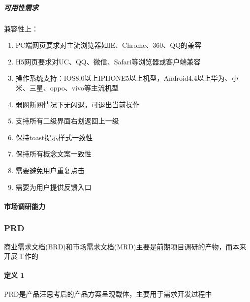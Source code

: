 \documentclass[letterpaper,11pt,english]{sphinxmanual}
\begin{document}
\subparagraph{可用性需求}
\label{\detokenize{chapter_knowledge/MRD:id8}}
兼容性上：
\begin{enumerate}
%
\item {} 
PC端网页要求对主流浏览器如IE、Chrome、360、QQ的兼容

\item {} 
H5网页要求对UC、QQ、微信、Safari等浏览器或客户端兼容%
\begin{footnote}[487]\sphinxAtStartFootnote
{}
%
\end{footnote}

\item {} 
操作系统支持：IOS8.0以上IPHONE5以上机型，Android4.4以上华为、小米、三星、oppo、vivo等主流机型

\item {} 
弱网断网情况下无闪退，可退出当前操作

\item {} 
支持所有二级界面右划返回上一级

\item {} 
保持toast提示样式一致性

\item {} 
保持所有概念文案一致性

\item {} 
需要避免用户重复点击

\item {} 
需要为用户提供反馈入口

\end{enumerate}


\paragraph{市场调研能力}
\label{\detokenize{chapter_knowledge/MRD:id9}}

\subsubsection{PRD}
\label{\detokenize{chapter_knowledge/PRD:prd}}\label{\detokenize{chapter_knowledge/PRD::doc}}
商业需求文档(BRD)和市场需求文档(MRD)主要是前期项目调研的产物，而本来开展工作的


\paragraph{定义 1\sphinxfootnotemark[488]}
\label{\detokenize{chapter_knowledge/PRD:id1}}%
\begin{footnotetext}[488]\sphinxAtStartFootnote
{}
%
\end{footnotetext}\ignorespaces 
PRD是产品汪思考后的产品方案呈现载体，主要用于需求开发过程中
\end{document}
